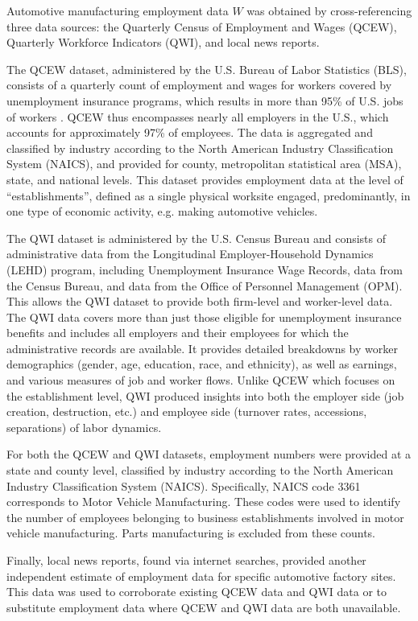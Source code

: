 \documentclass[sn-mathphys,Numbered]{sn-jnl}%
\begin{document}
Automotive manufacturing employment data $W$ was obtained by cross-referencing three data sources: the Quarterly Census of Employment and Wages (QCEW), Quarterly Workforce Indicators (QWI), and local news reports. 

The QCEW dataset, administered by the U.S. Bureau of Labor Statistics (BLS), consists of a quarterly count of employment and wages for workers covered by unemployment insurance programs, which results in more than 95\% of U.S. jobs of workers \cite{Sadeghi2008-km}. QCEW thus encompasses nearly all employers in the U.S., which accounts for approximately 97\% of employees. The data is aggregated and classified by industry according to the North American Industry Classification System (NAICS), and provided for county, metropolitan statistical area (MSA), state, and national levels. This dataset provides employment data at the level of ``establishments'', defined as a single physical worksite engaged, predominantly, in one type of economic activity, e.g. making automotive vehicles.

The QWI dataset is administered by the U.S. Census Bureau and consists of administrative data from the Longitudinal Employer-Household Dynamics (LEHD) program, including Unemployment Insurance Wage Records, data from the Census Bureau, and data from the Office of Personnel Management (OPM). This allows the QWI dataset to provide both firm-level and worker-level data. The QWI data covers more than just those eligible for unemployment insurance benefits and includes all employers and their employees for which the administrative records are available. It provides detailed breakdowns by worker demographics (gender, age, education, race, and ethnicity), as well as earnings, and various measures of job and worker flows. Unlike QCEW which focuses on the establishment level, QWI produced insights into both the employer side (job creation, destruction, etc.) and employee side (turnover rates, accessions, separations) of labor dynamics.

For both the QCEW and QWI datasets, employment numbers were provided at a state and county level, classified by industry according to the North American Industry Classification System (NAICS). Specifically, NAICS code 3361 corresponds to Motor Vehicle Manufacturing. These codes were used to identify the number of employees belonging to business establishments involved in motor vehicle manufacturing. Parts manufacturing is excluded from these counts. 

Finally, local news reports, found via internet searches, provided another independent estimate of employment data for specific automotive factory sites. This data was used to corroborate existing QCEW data and QWI data or to substitute employment data where QCEW and QWI data are both unavailable.
\end{document}
